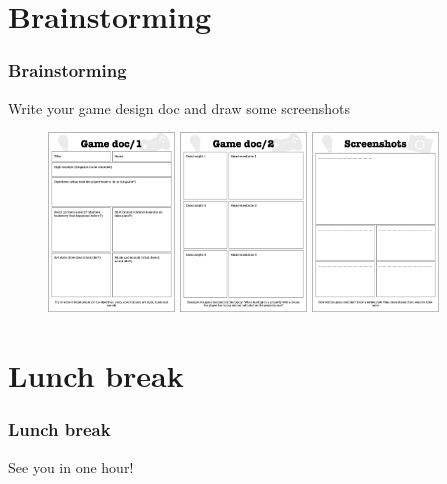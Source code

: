 \documentclass{beamer}
\begin{document}
\section{Brainstorming}
\begin{frame}
\frametitle{Brainstorming}
Write your game design doc and draw some screenshots
\begin{figure}
\includegraphics[width=0.3\textwidth]{figures/game_doc1.png}
\includegraphics[width=0.3\textwidth]{figures/game_doc2.png}
\includegraphics[width=0.3\textwidth]{figures/screenshots.png}
\end{figure}
\end{frame}

\section{Lunch break}
\begin{frame}
\frametitle{Lunch break}
See you in one hour!
\end{frame}
\end{document}
